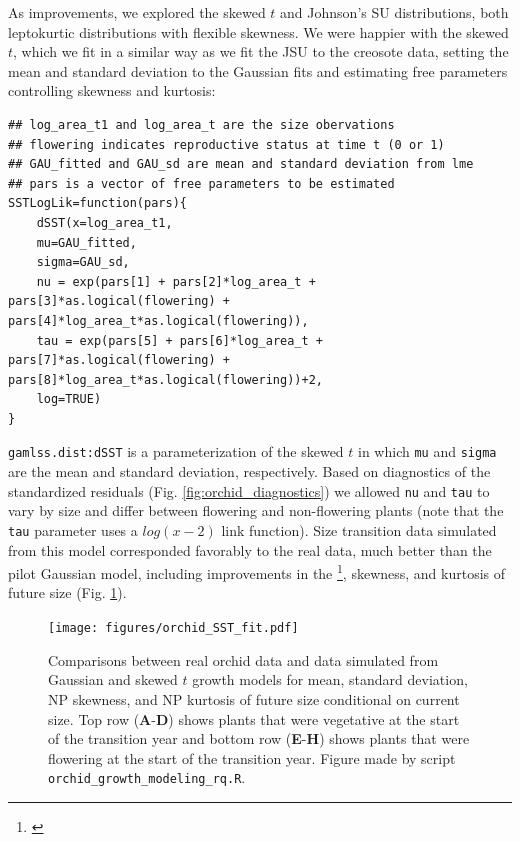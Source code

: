\documentclass[12pt]{article}
\newcommand{\tom}[2]{{\color{red}{#1}}\footnote{\textit{\color{red}{#2}}}}
\begin{document}
As improvements, we explored the skewed $t$ and Johnson's SU distributions, both leptokurtic distributions with flexible skewness. 
We were happier with the skewed $t$, which we fit in a similar way as we fit the JSU to the creosote data, setting the mean and standard deviation to the Gaussian fits and estimating free parameters controlling skewness and kurtosis:
\begin{lstlisting}
## log_area_t1 and log_area_t are the size obervations
## flowering indicates reproductive status at time t (0 or 1)
## GAU_fitted and GAU_sd are mean and standard deviation from lme
## pars is a vector of free parameters to be estimated
SSTLogLik=function(pars){
	dSST(x=log_area_t1, 
	mu=GAU_fitted,
	sigma=GAU_sd,
	nu = exp(pars[1] + pars[2]*log_area_t + pars[3]*as.logical(flowering) + pars[4]*log_area_t*as.logical(flowering)),
	tau = exp(pars[5] + pars[6]*log_area_t + pars[7]*as.logical(flowering) + pars[8]*log_area_t*as.logical(flowering))+2, 
	log=TRUE)
}
\end{lstlisting}
\verb|gamlss.dist:dSST| is a parameterization of the skewed $t$ in which \verb|mu| and \verb|sigma| are the mean and standard deviation, respectively. 
Based on diagnostics of the standardized residuals (Fig. \ref{fig:orchid_diagnostics}) we allowed \verb|nu| and \verb|tau| to vary by size and differ between flowering and non-flowering plants (note that the \verb|tau| parameter uses a $log(x-2)$ link function). 
Size transition data simulated from this model corresponded favorably to the real data, much better than the pilot Gaussian model, including improvements in the \tom{standard deviation}{Again, the improvement here is suprising to me and I am unsure what to say about it.}, skewness, and kurtosis of future size (Fig. \ref{fig:orchid_SST_fit}). 

\begin{figure}[tbp]
	\centering
	\texttt{[image: figures/orchid\_SST\_fit.pdf]}
	\caption{Comparisons between real orchid data and data simulated from Gaussian and skewed $t$ growth models for mean, standard deviation, NP skewness, and NP kurtosis of future size conditional on current size. Top row (\textbf{A}-\textbf{D}) shows plants that were vegetative at the start of the transition year and bottom row (\textbf{E}-\textbf{H}) shows plants that were flowering at the start of the transition year. Figure made by script \texttt{orchid\_growth\_modeling\_rq.R}.}
	\label{fig:orchid_SST_fit}
\end{figure} 
\end{document}
